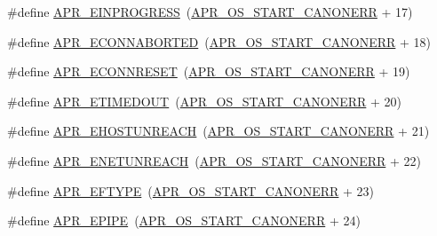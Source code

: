 \begin{DoxyCompactItemize}
\item 
\#define \mbox{\hyperlink{group___a_p_r___error_ga5c311361f4f68f289c90f3cdfd77eb79}{A\+P\+R\+\_\+\+E\+I\+N\+P\+R\+O\+G\+R\+E\+SS}}~(\mbox{\hyperlink{group__apr__errno_ga7bca957c11b80b31cb54b0d2cbe9e025}{A\+P\+R\+\_\+\+O\+S\+\_\+\+S\+T\+A\+R\+T\+\_\+\+C\+A\+N\+O\+N\+E\+RR}} + 17)
\item 
\#define \mbox{\hyperlink{group___a_p_r___error_ga9458da18e0ee46a5d37c9cdfdc43efd2}{A\+P\+R\+\_\+\+E\+C\+O\+N\+N\+A\+B\+O\+R\+T\+ED}}~(\mbox{\hyperlink{group__apr__errno_ga7bca957c11b80b31cb54b0d2cbe9e025}{A\+P\+R\+\_\+\+O\+S\+\_\+\+S\+T\+A\+R\+T\+\_\+\+C\+A\+N\+O\+N\+E\+RR}} + 18)
\item 
\#define \mbox{\hyperlink{group___a_p_r___error_ga264bfe2056e917728e9ed060b58869c2}{A\+P\+R\+\_\+\+E\+C\+O\+N\+N\+R\+E\+S\+ET}}~(\mbox{\hyperlink{group__apr__errno_ga7bca957c11b80b31cb54b0d2cbe9e025}{A\+P\+R\+\_\+\+O\+S\+\_\+\+S\+T\+A\+R\+T\+\_\+\+C\+A\+N\+O\+N\+E\+RR}} + 19)
\item 
\#define \mbox{\hyperlink{group___a_p_r___error_ga6aeccbe9accb34f0adc1cb1ab9a82a8d}{A\+P\+R\+\_\+\+E\+T\+I\+M\+E\+D\+O\+UT}}~(\mbox{\hyperlink{group__apr__errno_ga7bca957c11b80b31cb54b0d2cbe9e025}{A\+P\+R\+\_\+\+O\+S\+\_\+\+S\+T\+A\+R\+T\+\_\+\+C\+A\+N\+O\+N\+E\+RR}} + 20)
\item 
\#define \mbox{\hyperlink{group___a_p_r___error_ga489b0c02fa7cf33ed6d698d385661f86}{A\+P\+R\+\_\+\+E\+H\+O\+S\+T\+U\+N\+R\+E\+A\+CH}}~(\mbox{\hyperlink{group__apr__errno_ga7bca957c11b80b31cb54b0d2cbe9e025}{A\+P\+R\+\_\+\+O\+S\+\_\+\+S\+T\+A\+R\+T\+\_\+\+C\+A\+N\+O\+N\+E\+RR}} + 21)
\item 
\#define \mbox{\hyperlink{group___a_p_r___error_gab9b7124a88817d1b69cdef059f7dc689}{A\+P\+R\+\_\+\+E\+N\+E\+T\+U\+N\+R\+E\+A\+CH}}~(\mbox{\hyperlink{group__apr__errno_ga7bca957c11b80b31cb54b0d2cbe9e025}{A\+P\+R\+\_\+\+O\+S\+\_\+\+S\+T\+A\+R\+T\+\_\+\+C\+A\+N\+O\+N\+E\+RR}} + 22)
\item 
\#define \mbox{\hyperlink{group___a_p_r___error_gac358701354d03c37e3f0de12ed6d9afc}{A\+P\+R\+\_\+\+E\+F\+T\+Y\+PE}}~(\mbox{\hyperlink{group__apr__errno_ga7bca957c11b80b31cb54b0d2cbe9e025}{A\+P\+R\+\_\+\+O\+S\+\_\+\+S\+T\+A\+R\+T\+\_\+\+C\+A\+N\+O\+N\+E\+RR}} + 23)
\item 
\#define \mbox{\hyperlink{group___a_p_r___error_gae985330e30e374714ff1742485597f5d}{A\+P\+R\+\_\+\+E\+P\+I\+PE}}~(\mbox{\hyperlink{group__apr__errno_ga7bca957c11b80b31cb54b0d2cbe9e025}{A\+P\+R\+\_\+\+O\+S\+\_\+\+S\+T\+A\+R\+T\+\_\+\+C\+A\+N\+O\+N\+E\+RR}} + 24)
\item 

\end{DoxyCompactItemize}
